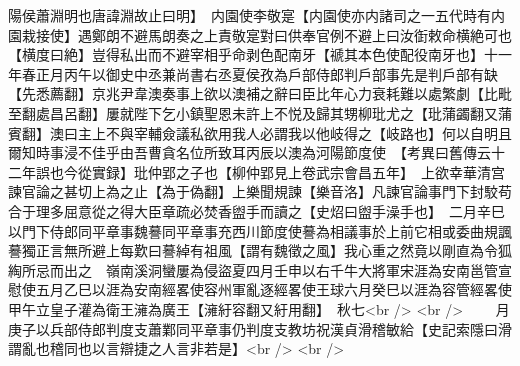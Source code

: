 陽侯蕭淵明也唐諱淵故止曰明】　内園使李敬寔【内園使亦内諸司之一五代時有内園栽接使】遇鄭朗不避馬朗奏之上責敬寔對曰供奉官例不避上曰汝衘敕命横絶可也【横度曰絶】豈得私出而不避宰相乎命剥色配南牙【禠其本色使配役南牙也】十一年春正月丙午以御史中丞兼尚書右丞夏侯孜為戶部侍郎判戶部事先是判戶部有缺【先悉薦翻】京兆尹韋澳奏事上欲以澳補之辭曰臣比年心力衰耗難以處繁劇【比毗至翻處昌呂翻】屢就陛下乞小鎮聖恩未許上不悦及歸其甥柳玭尤之【玭蒲蠲翻又蒲賓翻】澳曰主上不與宰輔僉議私欲用我人必謂我以他岐得之【岐路也】何以自明且爾知時事浸不佳乎由吾曹貪名位所致耳丙辰以澳為河陽節度使　【考異曰舊傳云十二年誤也今從實録】玭仲郢之子也【柳仲郢見上卷武宗會昌五年】　上欲幸華清宫諫官論之甚切上為之止【為于偽翻】上樂聞規諫【樂音洛】凡諫官論事門下封駮苟合于理多屈意從之得大臣章疏必焚香盥手而讀之【史炤曰盥手澡手也】　二月辛巳以門下侍郎同平章事魏謩同平章事充西川節度使謩為相議事於上前它相或委曲規諷謩獨正言無所避上每歎曰謩綽有祖風【謂有魏徵之風】我心重之然竟以剛直為令狐綯所忌而出之　嶺南溪洞蠻屢為侵盜夏四月壬申以右千牛大將軍宋涯為安南邕管宣慰使五月乙巳以涯為安南經畧使容州軍亂逐經畧使王球六月癸巳以涯為容管經畧使甲午立皇子灌為衛王澭為廣王【澭紆容翻又紆用翻】　秋七<br />
<br />
　　月庚子以兵部侍郎判度支蕭鄴同平章事仍判度支教坊祝漢貞滑稽敏給【史記索隱曰滑謂亂也稽同也以言辯捷之人言非若是】<br />
<br />
